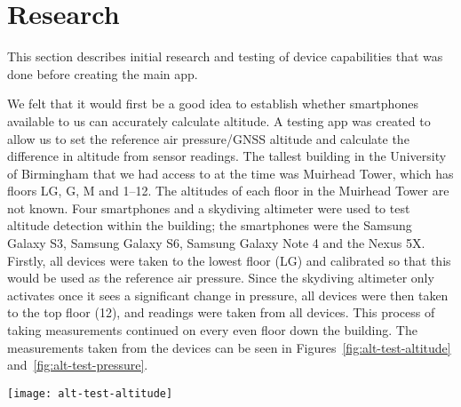 \section{Research}\label{sec:research}
This section describes initial research and testing of device capabilities that was done before creating the main app.

We felt that it would first be a good idea to establish whether smartphones available to us can accurately calculate altitude. A testing app was created to allow us to set the reference air pressure/GNSS altitude and calculate the difference in altitude from sensor readings.
The tallest building in the University of Birmingham that we had access to at the time was Muirhead Tower, which has floors LG, G, M and 1--12. The altitudes of each floor in the Muirhead Tower are not known. Four smartphones and a skydiving altimeter were used to test altitude detection within the building; the smartphones were the Samsung Galaxy S3, Samsung Galaxy S6, Samsung Galaxy Note 4 and the Nexus 5X.
Firstly, all devices were taken to the lowest floor (LG) and calibrated so that this would be used as the reference air pressure. Since the skydiving altimeter only activates once it sees a significant change in pressure, all devices were then taken to the top floor (12), and readings were taken from all devices. This process of taking measurements continued on every even floor down the building.
The measurements taken from the devices can be seen in Figures~\ref{fig:alt-test-altitude} and~\ref{fig:alt-test-pressure}.

\begin{figure*}[ht]
    \centering
    \texttt{[image: alt-test-altitude]}
    \caption{Altitude measurements from smartphones in Muirhead Tower}\label{fig:alt-test-altitude}
\end{figure*}


